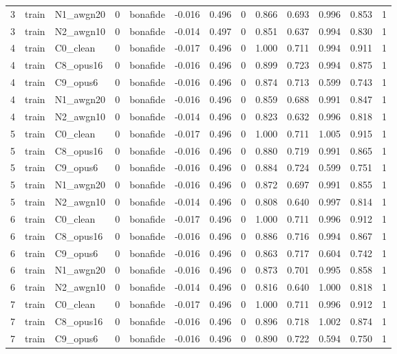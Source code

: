 \begin{tabular}{rllrlrrrrrrrr}
3 & train & N1_awgn20 & 0 & bonafide & -0.016 & 0.496 & 0 & 0.866 & 0.693 & 0.996 & 0.853 & 1 \\
3 & train & N2_awgn10 & 0 & bonafide & -0.014 & 0.497 & 0 & 0.851 & 0.637 & 0.994 & 0.830 & 1 \\
4 & train & C0_clean & 0 & bonafide & -0.017 & 0.496 & 0 & 1.000 & 0.711 & 0.994 & 0.911 & 1 \\
4 & train & C8_opus16 & 0 & bonafide & -0.016 & 0.496 & 0 & 0.899 & 0.723 & 0.994 & 0.875 & 1 \\
4 & train & C9_opus6 & 0 & bonafide & -0.016 & 0.496 & 0 & 0.874 & 0.713 & 0.599 & 0.743 & 1 \\
4 & train & N1_awgn20 & 0 & bonafide & -0.016 & 0.496 & 0 & 0.859 & 0.688 & 0.991 & 0.847 & 1 \\
4 & train & N2_awgn10 & 0 & bonafide & -0.014 & 0.496 & 0 & 0.823 & 0.632 & 0.996 & 0.818 & 1 \\
5 & train & C0_clean & 0 & bonafide & -0.017 & 0.496 & 0 & 1.000 & 0.711 & 1.005 & 0.915 & 1 \\
5 & train & C8_opus16 & 0 & bonafide & -0.016 & 0.496 & 0 & 0.880 & 0.719 & 0.991 & 0.865 & 1 \\
5 & train & C9_opus6 & 0 & bonafide & -0.016 & 0.496 & 0 & 0.884 & 0.724 & 0.599 & 0.751 & 1 \\
5 & train & N1_awgn20 & 0 & bonafide & -0.016 & 0.496 & 0 & 0.872 & 0.697 & 0.991 & 0.855 & 1 \\
5 & train & N2_awgn10 & 0 & bonafide & -0.014 & 0.496 & 0 & 0.808 & 0.640 & 0.997 & 0.814 & 1 \\
6 & train & C0_clean & 0 & bonafide & -0.017 & 0.496 & 0 & 1.000 & 0.711 & 0.996 & 0.912 & 1 \\
6 & train & C8_opus16 & 0 & bonafide & -0.016 & 0.496 & 0 & 0.886 & 0.716 & 0.994 & 0.867 & 1 \\
6 & train & C9_opus6 & 0 & bonafide & -0.016 & 0.496 & 0 & 0.863 & 0.717 & 0.604 & 0.742 & 1 \\
6 & train & N1_awgn20 & 0 & bonafide & -0.016 & 0.496 & 0 & 0.873 & 0.701 & 0.995 & 0.858 & 1 \\
6 & train & N2_awgn10 & 0 & bonafide & -0.014 & 0.496 & 0 & 0.816 & 0.640 & 1.000 & 0.818 & 1 \\
7 & train & C0_clean & 0 & bonafide & -0.017 & 0.496 & 0 & 1.000 & 0.711 & 0.996 & 0.912 & 1 \\
7 & train & C8_opus16 & 0 & bonafide & -0.016 & 0.496 & 0 & 0.896 & 0.718 & 1.002 & 0.874 & 1 \\
7 & train & C9_opus6 & 0 & bonafide & -0.016 & 0.496 & 0 & 0.890 & 0.722 & 0.594 & 0.750 & 1 \\

\end{tabular}
